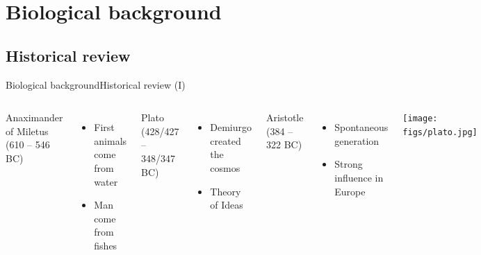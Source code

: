 \documentclass[10pt,compress]{beamer} %
\begin{document}


\section{Biological background}
\subsection{Historical review}
\begin{frame}{Biological background}{Historical review (I)}
 	\begin{columns}
		Anaximander of Miletus (610 – 546 BC)

 	 	\begin{itemize}
		\item First animals come from water
		\item Man come from fishes
		\end{itemize}

		Plato (428/427 – 348/347 BC)
		\begin{itemize}
		\item Demiurgo created the cosmos
		\item Theory of Ideas
		\end{itemize}
		
		Aristotle (384 – 322 BC)
		\begin{itemize}
		\item Spontaneous generation
		\item Strong influence in Europe
		\end{itemize}
		\centering\texttt{[image: figs/plato.jpg]}
	\end{columns}
\end{frame}
\end{document}
